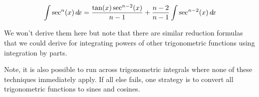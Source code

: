 \documentclass{ximera}
\begin{document}
\[
\int \sec^{n}(x) \mathop{}\!d\! x= \frac{\tan(x) \sec^{n-2}(x)}{n-1} + \frac{n-2}{n-1} \int \sec^{n-2}(x) \mathop{}\!d\! x 
\]

We won't derive them here but note that there are similar reduction formulas that we could derive for integrating powers of other trigonometric functions using integration by parts. 

%
%
%
%
%
%
%
%
%
%
%
%
\begin{remark}
Note, it is also possible to run across trigonometric integrals where none of these techniques immediately apply.  If all else fails, one strategy is to convert all trigonometric functions to sines and cosines.
\end{remark}
\end{document}
